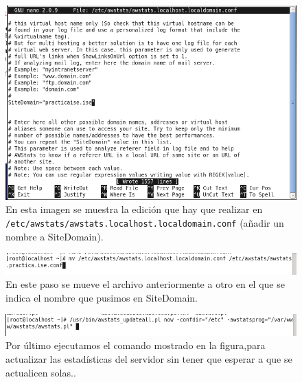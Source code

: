\begin{figure}[H]
  \begin{center}
    \includegraphics[width=1\textwidth]{imagenes/aw4}
    \caption{En esta imagen se muestra la edición que hay que realizar en \newline\texttt{/etc/awstats/awstats.localhost.localdomain.conf} (añadir un nombre a SiteDomain).}
    \label{fig45}
  \end{center}
\end{figure}
\begin{figure}[H]
  \begin{center}
    \includegraphics[width=1\textwidth]{imagenes/aw5}
    \caption{En este paso se mueve el archivo anteriormente a otro en el que se indica el nombre que pusimos en SiteDomain.}
    \label{fig46}
  \end{center}
\end{figure}
\begin{figure}[H]
  \begin{center}
    \includegraphics[width=1\textwidth]{imagenes/aw6}
    \caption{Por último ejecutamos el comando mostrado en la figura,para actualizar las estadísticas del servidor sin tener que esperar a que se actualicen solas..}
    \label{fig47}
  \end{center}
\end{figure}
